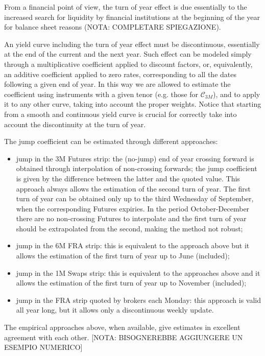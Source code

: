 \documentclass[11pt,reqno]{amsart}
\begin{document}
From a financial point of view, the turn of year effect is due essentially to the increased search for liquidity by financial institutions at the beginning of the year for balance sheet reasons (NOTA: COMPLETARE SPIEGAZIONE).
\par
An yield curve including the turn of year effect must be discontinuous, essentially at the end of the current and the next year.
Such effect can be modeled simply through a multiplicative coefficient applied to discount factors, or, equivalently, an additive coefficient applied to zero rates, corresponding to all the dates following a given end of year.
In this way we are allowed to estimate the coefficient using instruments with a given tenor (e.g. those for $\mathcal C_{3M}$), and to apply it to any other curve, taking into account the proper weights.
Notice that starting from a smooth and continuous yield curve is crucial for correctly take into account the discontinuity at the turn of year.
\par
The jump coefficient can be estimated through different approaches:
\begin{itemize}
  \item jump in the 3M Futures strip: the (no-jump) end of year crossing forward is obtained through interpolation of non-crossing forwards; the jump coefficient is given by the difference between the latter and the quoted value. This approach always allows the estimation of the second turn of year. The first turn of year can be obtained only up to the third Wednesday of September, when the corresponding Futures expiries. In the period October-December there are no non-crossing Futures to interpolate and the first turn of year should be extrapolated from the second, making the method not robust;
  \item jump in the 6M FRA strip: this is equivalent to the approach above but it allows the estimation of the first turn of year up to June (included);
  \item jump in the 1M Swaps strip: this is equivalent to the approaches above and it allows the estimation of the first turn of year up to November (included);
  \item jump in the FRA strip quoted by brokers each Monday: this approach is valid all year long, but it allows only a discontinuous weekly update.
\end{itemize}
The empirical approaches above, when available, give estimates in excellent agreement with each other.
[NOTA: BISOGNEREBBE AGGIUNGERE UN ESEMPIO NUMERICO]
\end{document}
